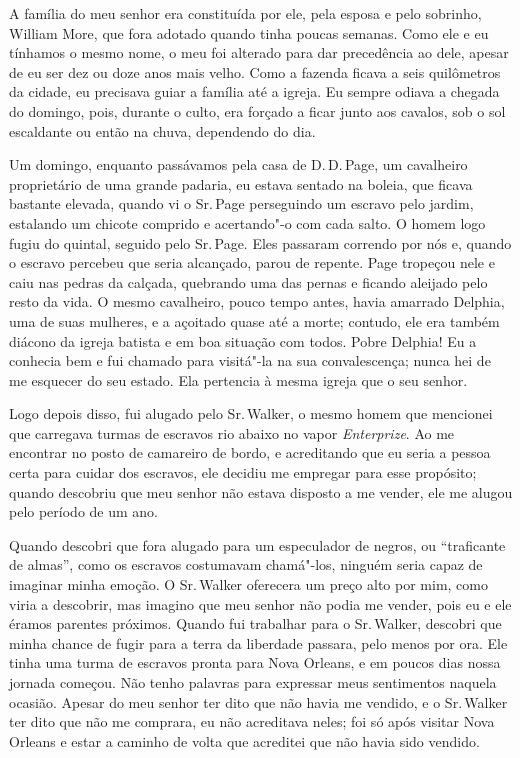 A família do meu senhor era constituída por ele, pela esposa e pelo
sobrinho, William More, que fora adotado quando tinha poucas semanas.
Como ele e eu tínhamos o mesmo nome, o meu foi alterado para dar
precedência ao dele, apesar de eu ser dez ou doze anos mais velho. Como
a fazenda ficava a seis quilômetros da cidade, eu precisava guiar a
família até a igreja. Eu sempre odiava a chegada do domingo, pois,
durante o culto, era forçado a ficar junto aos cavalos, sob o sol
escaldante ou então na chuva, dependendo do dia.

Um domingo, enquanto passávamos pela casa de D.\,D.\,Page, um cavalheiro
proprietário de uma grande padaria, eu estava sentado na boleia, que
ficava bastante elevada, quando vi o Sr.\,Page perseguindo um escravo
pelo jardim, estalando um chicote comprido e acertando"-o com cada salto.
O homem logo fugiu do quintal, seguido pelo Sr.\,Page. Eles passaram
correndo por nós e, quando o escravo percebeu que seria alcançado, parou
de repente. Page tropeçou nele e caiu nas pedras da calçada, quebrando
uma das pernas e ficando aleijado pelo resto da vida. O mesmo
cavalheiro, pouco tempo antes, havia amarrado Delphia, uma de suas
mulheres, e a açoitado quase até a morte; contudo, ele era também
diácono da igreja batista e em boa situação com todos. Pobre Delphia! Eu
a conhecia bem e fui chamado para visitá"-la na sua convalescença; nunca
hei de me esquecer do seu estado. Ela pertencia à mesma igreja que o seu
senhor.

Logo depois disso, fui alugado pelo Sr.\,Walker, o mesmo homem que
mencionei que carregava turmas de escravos rio abaixo no vapor
\emph{Enterprize}. Ao me encontrar no posto de camareiro de bordo, e
acreditando que eu seria a pessoa certa para cuidar dos escravos, ele
decidiu me empregar para esse propósito; quando descobriu que meu senhor
não estava disposto a me vender, ele me alugou pelo período de um ano.

Quando descobri que fora alugado para um especulador de negros, ou
``traficante de almas'', como os escravos costumavam chamá"-los, ninguém
seria capaz de imaginar minha emoção. O Sr.\,Walker oferecera um preço
alto por mim, como viria a descobrir, mas imagino que meu senhor não
podia me vender, pois eu e ele éramos parentes próximos. Quando fui
trabalhar para o Sr.\,Walker, descobri que minha chance de fugir para a
terra da liberdade passara, pelo menos por ora. Ele tinha uma turma de
escravos pronta para Nova Orleans, e em poucos dias nossa jornada
começou. Não tenho palavras para expressar meus sentimentos naquela \label{ref6}
ocasião. Apesar do meu senhor ter dito que não havia me vendido, e o Sr.\,Walker ter dito que não me comprara, eu não acreditava neles; foi só
após visitar Nova Orleans e estar a caminho de volta que acreditei que
não havia sido vendido.

